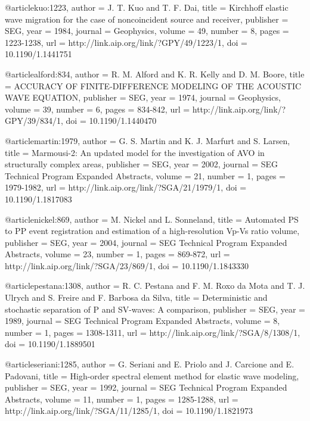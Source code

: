 @article{kuo:1223,
  author =	 {J. T. Kuo and T. F. Dai},
  title =	 {Kirchhoff elastic wave migration for the case of
                  noncoincident source and receiver},
  publisher =	 {SEG},
  year =	 1984,
  journal =	 {Geophysics},
  volume =	 49,
  number =	 8,
  pages =	 {1223-1238},
  url =		 {http://link.aip.org/link/?GPY/49/1223/1},
  doi =		 {10.1190/1.1441751}
}

@article{alford:834,
  author =	 {R. M. Alford and K. R. Kelly and D. M. Boore},
  title =	 {ACCURACY OF FINITE-DIFFERENCE MODELING OF THE
                  ACOUSTIC WAVE EQUATION},
  publisher =	 {SEG},
  year =	 1974,
  journal =	 {Geophysics},
  volume =	 39,
  number =	 6,
  pages =	 {834-842},
  url =		 {http://link.aip.org/link/?GPY/39/834/1},
  doi =		 {10.1190/1.1440470}
}

@article{martin:1979,
  author =	 {G. S. Martin and K. J. Marfurt and S. Larsen},
  title =	 {Marmousi-2: An updated model for the investigation
                  of AVO in structurally complex areas},
  publisher =	 {SEG},
  year =	 2002,
  journal =	 {SEG Technical Program Expanded Abstracts},
  volume =	 21,
  number =	 1,
  pages =	 {1979-1982},
  url =		 {http://link.aip.org/link/?SGA/21/1979/1},
  doi =		 {10.1190/1.1817083}
}

@article{nickel:869,
  author =	 {M. Nickel and L. Sonneland},
  title =	 {Automated {PS} to {PP} event registration and
                  estimation of a high-resolution {V}p-{V}s ratio
                  volume},
  publisher =	 {SEG},
  year =	 2004,
  journal =	 {SEG Technical Program Expanded Abstracts},
  volume =	 23,
  number =	 1,
  pages =	 {869-872},
  url =		 {http://link.aip.org/link/?SGA/23/869/1},
  doi =		 {10.1190/1.1843330}
}

@article{pestana:1308,
  author =	 {R. C. Pestana and F. M. Roxo da Mota and
                  T. J. Ulrych and S. Freire and F. Barbosa
                  da Silva},
  title =	 {Deterministic and stochastic separation of {P} and
                  {SV}-waves: A comparison},
  publisher =	 {SEG},
  year =	 1989,
  journal =	 {SEG Technical Program Expanded Abstracts},
  volume =	 8,
  number =	 1,
  pages =	 {1308-1311},
  url =		 {http://link.aip.org/link/?SGA/8/1308/1},
  doi =		 {10.1190/1.1889501}
}

@article{seriani:1285,
  author =	 {G. Seriani and E. Priolo and J. Carcione and
                  E. Padovani},
  title =	 {High-order spectral element method for elastic wave
                  modeling},
  publisher =	 {SEG},
  year =	 1992,
  journal =	 {SEG Technical Program Expanded Abstracts},
  volume =	 11,
  number =	 1,
  pages =	 {1285-1288},
  url =		 {http://link.aip.org/link/?SGA/11/1285/1},
  doi =		 {10.1190/1.1821973}
}

